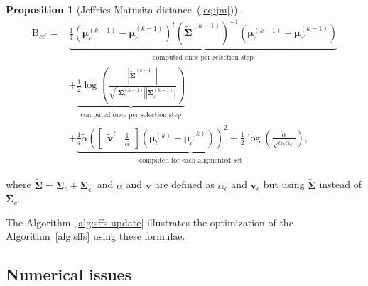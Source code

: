 \documentclass[journal,10pt]{IEEEtran}
\newtheorem{prop}{Proposition}
\begin{document}
      \begin{prop}[Jeffries-Matusita distance~(\ref{eq:jm})]
      \begin{align}
        \label{eq:jm-update}
            \text{B}_{cc^\prime} = &\underbrace{\frac{1}{4} (\boldsymbol{\mu}_c^{(k-1)} - \boldsymbol{\mu}_{c^\prime}^{(k-1)})^t ( \boldsymbol{\tilde{\Sigma}}^{(k-1)} )^{-1} (\boldsymbol{\mu}_c^{(k-1)} - \boldsymbol{\mu}_{c^\prime}^{(k-1)})}_{\substack{\text{computed once per selection step}}} \nonumber \\
            &+ \underbrace{\frac{1}{2} \log \left( \frac{|\boldsymbol{\tilde{\Sigma}}^{(k-1)}|}{\sqrt{|\boldsymbol{\Sigma}_c^{(k-1)}| |\boldsymbol{\Sigma}_{c^\prime}^{(k-1)}|}} \right)}_{\substack{\text{computed once per selection step}}} \nonumber \\
            &+ \underbrace{\frac{1}{4} \tilde{\alpha} ( \left[\begin{array}{cc} \mathbf{\tilde{v}}^t & \frac{1}{\tilde{\alpha}} \end{array}\right] (\boldsymbol{\mu}_c^{(k)} - \boldsymbol{\mu}_{c^\prime}^{(k)}) )^2 + \frac{1}{2} \log \left( \frac{\tilde{\alpha}}{\sqrt{\alpha_c \alpha_{c^\prime}}} \right)}_{\substack{\text{computed for each augmented set}}},
      \end{align}
    \end{prop}
    \noindent where $\boldsymbol{\tilde{\Sigma}} = \boldsymbol{\Sigma}_c + \boldsymbol{\Sigma}_{c^\prime}$ and $\tilde{\alpha}$ and $\mathbf{\tilde{v}}$ are defined as $\alpha_c$ and $\mathbf{v}_c$ but using $\boldsymbol{\tilde{\Sigma}}$ instead of $\boldsymbol{\Sigma}_c$.
    
    The  Algorithm~\ref{alg:sffs-update} illustrates  the optimization
    of the Algorithm~\ref{alg:sffs} using these formulae.

    \subsection{Numerical issues}
\end{document}
